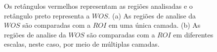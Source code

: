 \begin{figure}[H]
\centering
  \caption{Os retângulos vermelhos representam as regiões analisadas e o retângulo preto representa a $WOS$. 
  (a) As regiões de analise da $WOS$ são comparadas com a $ROI$ em uma única camada. 
  (b) As regiões de analise da $WOS$ são comparadas com a $ROI$ em diferentes escalas, neste caso, por meio de múltiplas camadas.}
  \label{fig:multires}
\end{figure}

